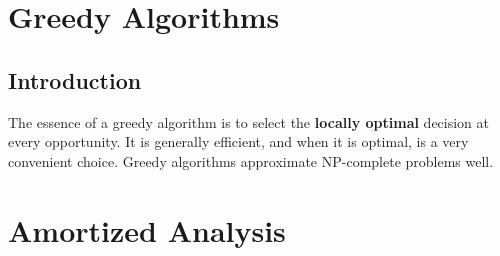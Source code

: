 \documentclass[a4paper,12pt]{report}
\begin{document}











\chapter{Greedy Algorithms}

\section{Introduction}

The essence of a greedy algorithm is to select the \textbf{locally optimal} decision at every opportunity. It is generally efficient, and when it is optimal, is a very convenient choice. Greedy algorithms approximate NP-complete problems well.





\chapter{Amortized Analysis}
\end{document}
